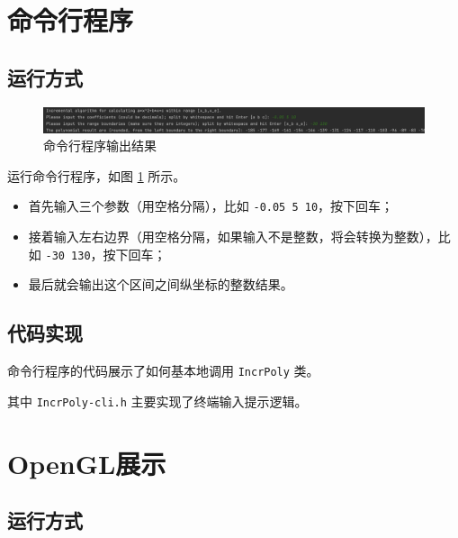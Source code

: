 \documentclass[math-font=newcm]{sjtuarticle}
\providecommand{\code}[2]{}
\begin{document}
\code{../source/IncrPoly/IncrPoly.hpp}{c++}

\section{命令行程序}

\subsection{运行方式}\label{sec:cliinput}

\begin{figure}[h]
    \includegraphics[width=\textwidth]{cli.png}
    \caption{命令行程序输出结果}\label{fig:cli}
\end{figure}

运行命令行程序，如图 \ref{fig:cli} 所示。
\begin{itemize}
    \item 首先输入三个参数（用空格分隔），比如 \verb"-0.05 5 10"，按下回车；
    \item 接着输入左右边界（用空格分隔，如果输入不是整数，将会转换为整数），比如 \verb"-30 130"，按下回车；
    \item 最后就会输出这个区间之间纵坐标的整数结果。
\end{itemize}

\subsection{代码实现}

命令行程序的代码展示了如何基本地调用 \verb"IncrPoly" 类。

\code{../source/IncrPoly/main.cpp}{c++}

\lstset{basicstyle=\ttfamily\scriptsize}

其中 \verb"IncrPoly-cli.h" 主要实现了终端输入提示逻辑。

\code{../source/IncrPoly/IncrPoly-cli.h}{c++}

\section{OpenGL展示}

\subsection{运行方式}
\end{document}
